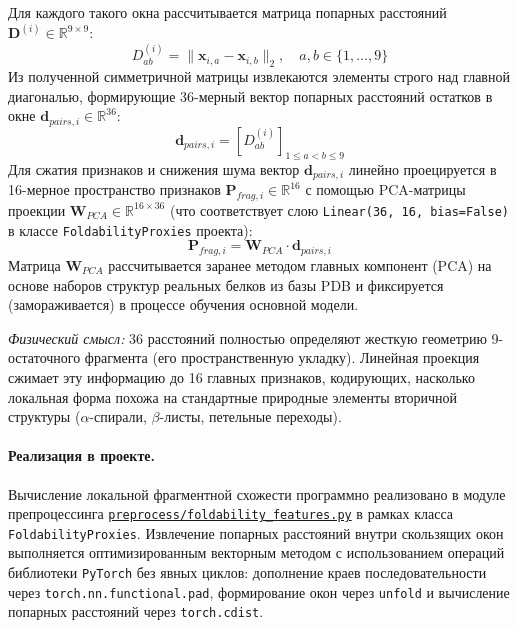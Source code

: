 \documentclass[12pt, a4paper]{article}
\begin{document}
\begin{enumerate}
    Для каждого такого окна рассчитывается матрица попарных расстояний $\mathbf{D}^{(i)} \in \mathbb{R}^{9 \times 9}$:
    \begin{equation}
        D^{(i)}_{ab} = \|\mathbf{x}_{i, a} - \mathbf{x}_{i, b}\|_2, \quad a, b \in \{1, \dots, 9\}
    \end{equation}
    Из полученной симметричной матрицы извлекаются элементы строго над главной диагональю, формирующие 36-мерный вектор попарных расстояний остатков в окне $\mathbf{d}_{pairs, i} \in \mathbb{R}^{36}$:
    \begin{equation}
        \mathbf{d}_{pairs, i} = \left[ D^{(i)}_{ab} \right]_{1 \le a < b \le 9}
    \end{equation}
    Для сжатия признаков и снижения шума вектор $\mathbf{d}_{pairs, i}$ линейно проецируется в 16-мерное пространство признаков $\mathbf{P}_{frag, i} \in \mathbb{R}^{16}$ с помощью PCA-матрицы проекции $\mathbf{W}_{PCA} \in \mathbb{R}^{16 \times 36}$ (что соответствует слою \texttt{Linear(36, 16, bias=False)} в классе \texttt{FoldabilityProxies} проекта):
    \begin{equation}
        \mathbf{P}_{frag, i} = \mathbf{W}_{PCA} \cdot \mathbf{d}_{pairs, i}
    \end{equation}
    Матрица $\mathbf{W}_{PCA}$ рассчитывается заранее методом главных компонент (PCA) на основе наборов структур реальных белков из базы PDB и фиксируется (замораживается) в процессе обучения основной модели.
    
    \textit{Физический смысл:} 36 расстояний полностью определяют жесткую геометрию 9-остаточного фрагмента (его пространственную укладку). Линейная проекция сжимает эту информацию до 16 главных признаков, кодирующих, насколько локальная форма похожа на стандартные природные элементы вторичной структуры ($\alpha$-спирали, $\beta$-листы, петельные переходы).
    
    \paragraph{Реализация в проекте.}
    Вычисление локальной фрагментной схожести программно реализовано в модуле препроцессинга \href{file:///home/pc/PycharmProjects/BbValidator/preprocess/foldability_features.py}{\texttt{preprocess/foldability\_features.py}} в рамках класса \texttt{FoldabilityProxies}. Извлечение попарных расстояний внутри скользящих окон выполняется оптимизированным векторным методом с использованием операций библиотеки \texttt{PyTorch} без явных циклов: дополнение краев последовательности через \texttt{torch.nn.functional.pad}, формирование окон через \texttt{unfold} и вычисление попарных расстояний через \texttt{torch.cdist}.
    

\end{enumerate}
\end{document}
